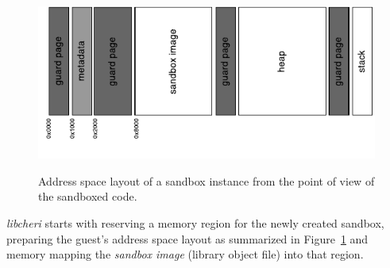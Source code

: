 \documentclass[a4paper,12pt,twoside,openright]{report}
\newcommand{\tool}[1]{\emph{#1}}
\newcommand{\lib}[1]{\tool{lib#1}}
\begin{document}

\begin{figure}
	\centering
	\includegraphics[width=1.0\textwidth]{dia_address_layout.pdf}
	\label{fig:AddressSpaceLayout}
	\caption{Address space layout of a sandbox instance from the point of view of the sandboxed code.}
\end{figure}

\lib{cheri} starts with reserving a memory region for the newly created sandbox, preparing the guest's address space layout as summarized in Figure~\ref{fig:AddressSpaceLayout} and memory mapping the \emph{sandbox image} (library object file) into that region. \label{sec:AddressSpaceLayout}
\end{document}
